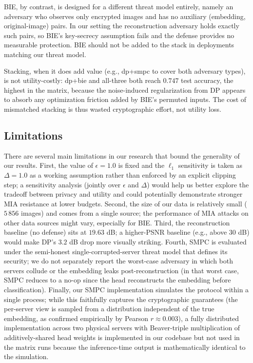 \documentclass[conference]{IEEEtran}
\begin{document}
BIE, by contrast, is designed for a different threat model entirely, namely an adversary who observes only encrypted images and has no auxiliary (embedding, original-image) pairs. In our setting the reconstruction adversary holds exactly such pairs, so BIE's key-secrecy assumption fails and the defense provides no measurable protection. BIE should not be added to the stack in deployments matching our threat model.

Stacking, when it does add value (e.g., dp+smpc to cover both adversary types), is not utility-costly: dp+bie and all-three both reach $0.747$ test accuracy, the highest in the matrix, because the noise-induced regularization from DP appears to absorb any optimization friction added by BIE's permuted inputs. The cost of mismatched stacking is thus wasted cryptographic effort, not utility loss.

\subsection{Limitations}
\label{sec:limitations}
There are several main limitations in our research that bound the generality of our results. First, the value of $\epsilon = 1.0$ is fixed and the $\ell_1$ sensitivity is taken as $\Delta = 1.0$ as a working assumption rather than enforced by an explicit clipping step; a sensitivity analysis (jointly over $\epsilon$ and $\Delta$) would help us better explore the tradeoff between privacy and utility and could potentially demonstrate stronger MIA resistance at lower budgets. Second, the size of our data is relatively small ($5\,856$ images) and comes from a single source; the performance of MIA attacks on other data sources might vary, especially for BIE. Third, the reconstruction baseline (no defense) sits at $19.63$ dB; a higher-PSNR baseline (e.g., above $30$ dB) would make DP's $3.2$ dB drop more visually striking. Fourth, SMPC is evaluated under the semi-honest single-corrupted-server threat model that defines its security; we do not separately report the worst-case adversary in which both servers collude or the embedding leaks post-reconstruction (in that worst case, SMPC reduces to a no-op since the head reconstructs the embedding before classification). Finally, our SMPC implementation simulates the protocol within a single process; while this faithfully captures the cryptographic guarantees (the per-server view is sampled from a distribution independent of the true embedding, as confirmed empirically by Pearson $r \approx 0.003$), a fully distributed implementation across two physical servers with Beaver-triple multiplication of additively-shared head weights is implemented in our codebase but not used in the matrix runs because the inference-time output is mathematically identical to the simulation.
\end{document}
